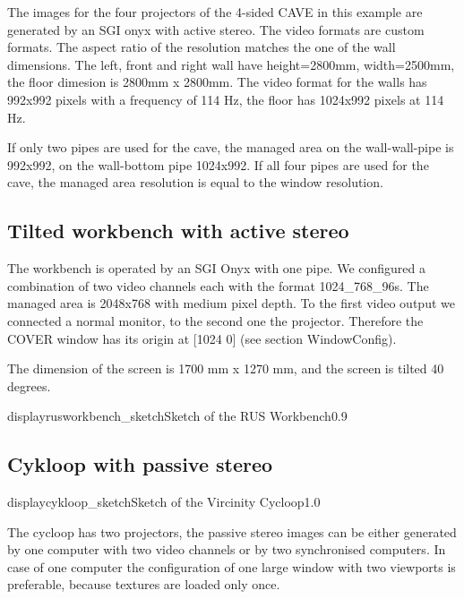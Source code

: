 The images for the four projectors of the 4-sided CAVE in this example are generated 
by an SGI onyx with active stereo. The video formats are custom formats. 
The aspect ratio of the resolution 
matches the one of the wall dimensions. The left, front and right wall
have height=2800mm, width=2500mm, the floor dimesion is 2800mm x 2800mm.
The video format for the walls has 992x992 pixels with a frequency of 
114 Hz, the floor has 1024x992 pixels at 114 Hz.

If only two pipes are used for the cave, the managed area on the
wall-wall-pipe is 992x992, on the wall-bottom pipe 1024x992.
If all four pipes are used for the cave, the managed area resolution is
equal to the window resolution.


\subsection{Tilted workbench with active stereo}

The workbench is operated by an SGI Onyx with one pipe.
We configured a 
combination of two video channels each with the format 1024\_768\_96s. 
The managed area is 2048x768 with medium pixel depth. 
To the first video output we connected a normal monitor, to the second 
one the projector. Therefore the COVER window has its origin at [1024 0]
(see section WindowConfig).
 
The dimension of the screen is 1700 mm x  1270 mm, and the screen is 
tilted 40 degrees.

\begin{covimg}{display}{rusworkbench_sketch}{Sketch of the RUS Workbench}{0.9}\end{covimg}


\subsection{Cykloop with passive stereo}
\begin{covimg}{display}{cykloop_sketch}{Sketch of the Vircinity Cycloop}{1.0}\end{covimg}

The cycloop has two projectors, the passive stereo images can be either generated by one
computer with two video channels or by two synchronised computers. In case of one
computer the configuration of one large window with two viewports is  preferable, because
textures are loaded only once.
